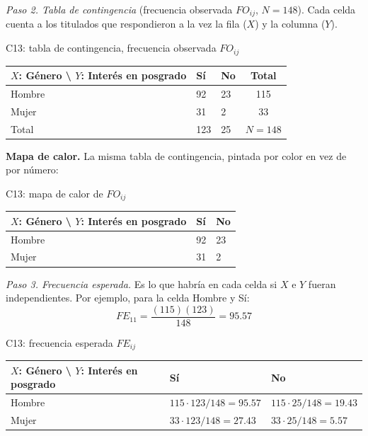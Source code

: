 \textit{Paso 2. Tabla de contingencia} (frecuencia observada $FO_{ij}$, $N = 148$). Cada celda cuenta a los titulados que respondieron a la vez la fila ($X$) y la columna ($Y$).

\begin{mitabla}{C13: tabla de contingencia, frecuencia observada $FO_{ij}$}
\begin{tabular}{L{3.8cm}C{3.00cm}C{3.00cm}|c}
\toprule
$X$: Género \textbackslash{} $Y$: Interés en posgrado & Sí & No & Total \\
\midrule
Hombre & 92 & 23 & 115 \\
Mujer & 31 & 2 & 33 \\
\midrule
Total & 123 & 25 & $N = 148$ \\
\bottomrule
\end{tabular}
\end{mitabla}

\textbf{Mapa de calor.} La misma tabla de contingencia, pintada por color en vez de por número:

\begin{mitabla}{C13: mapa de calor de $FO_{ij}$}
\begin{tabular}{L{3.8cm}C{3.00cm}C{3.00cm}}
\toprule
$X$: Género \textbackslash{} $Y$: Interés en posgrado & Sí & No \\
\midrule
Hombre & 92 & 23 \\
Mujer & 31 & 2 \\
\bottomrule
\end{tabular}
\end{mitabla}

\textit{Paso 3. Frecuencia esperada.} Es lo que habría en cada celda si $X$ e $Y$ fueran independientes. Por ejemplo, para la celda Hombre y Sí:
\[
FE_{11} = \frac{(115)(123)}{148} = 95.57
\]

\begin{mitabla}{C13: frecuencia esperada $FE_{ij}$}
\begin{tabular}{L{3.8cm}C{3.00cm}C{3.00cm}}
\toprule
$X$: Género \textbackslash{} $Y$: Interés en posgrado & Sí & No \\
\midrule
Hombre & $115\cdot123/148 = 95.57$ & $115\cdot25/148 = 19.43$ \\
Mujer & $33\cdot123/148 = 27.43$ & $33\cdot25/148 = 5.57$ \\
\bottomrule
\end{tabular}
\end{mitabla}

